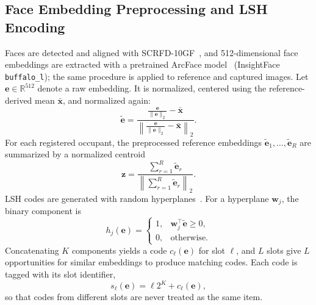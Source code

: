 \documentclass[pdflatex,sn-mathphys-num]{sn-jnl}%
\providecommand{\code}[1]{\texttt{#1}}%
\theoremstyle{thmstyleone}%
\theoremstyle{thmstyletwo}%
\theoremstyle{thmstylethree}%
\begin{document}
\subsection{Face Embedding Preprocessing and LSH Encoding}
\label{subsec:lsh_encoding}

Faces are detected and aligned with SCRFD-10GF~\cite{guo2022}, and 512-dimensional face embeddings are extracted with a pretrained ArcFace model~\cite{deng2019} (InsightFace \code{buffalo\_l}); the same procedure is applied to reference and captured images. Let $\mathbf{e} \in \mathbb{R}^{512}$ denote a raw embedding. It is normalized, centered using the reference-derived mean $\bar{\mathbf{x}}$, and normalized again:
\begin{equation}
    \tilde{\mathbf{e}}
    =
    \frac{
        \frac{\mathbf{e}}{\|\mathbf{e}\|_2}
        - \bar{\mathbf{x}}
    }{
        \left\|
        \frac{\mathbf{e}}{\|\mathbf{e}\|_2}
        - \bar{\mathbf{x}}
        \right\|_2
    }.
    \label{eq:embedding_preprocessing}
\end{equation}
For each registered occupant, the preprocessed reference embeddings $\tilde{\mathbf{e}}_1,\ldots,\tilde{\mathbf{e}}_R$ are summarized by a normalized centroid
\begin{equation}
    \mathbf{z}
    =
    \frac{
        \sum_{r=1}^{R}\tilde{\mathbf{e}}_r
    }{
        \left\|\sum_{r=1}^{R}\tilde{\mathbf{e}}_r\right\|_2
    }.
    \label{eq:identity_centroid}
\end{equation}
LSH codes are generated with random hyperplanes~\cite{charikar2002}. For a hyperplane $\mathbf{w}_j$, the binary component is
\begin{equation}
    h_j(\mathbf{e}) =
    \begin{cases}
        1, & \mathbf{w}_j^\top\tilde{\mathbf{e}} \geq 0,\\
        0, & \text{otherwise}.
    \end{cases}
    \label{eq:lsh_bit}
\end{equation}
Concatenating $K$ components yields a code $c_\ell(\mathbf{e})$ for slot $\ell$, and $L$ slots give $L$ opportunities for similar embeddings to produce matching codes. Each code is tagged with its slot identifier,
\begin{equation}
    s_\ell(\mathbf{e})
    =
    \ell 2^K + c_\ell(\mathbf{e}),
    \label{eq:tagged_code}
\end{equation}
so that codes from different slots are never treated as the same item.
\end{document}
